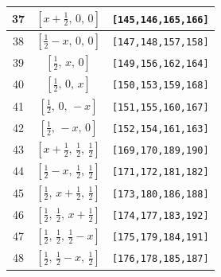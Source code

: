 \documentclass[fleqn,8pt]{jsarticle}
\begin{document}
\begin{longtable}{ccc}
37 & $\left[ x + \frac{1}{2},\, 0,\, 0 \right]$ & {\tt [145,146,165,166]} \\ \hline
38 & $\left[ \frac{1}{2} - x,\, 0,\, 0 \right]$ & {\tt [147,148,157,158]} \\ \hline
39 & $\left[ \frac{1}{2},\, x,\, 0 \right]$ & {\tt [149,156,162,164]} \\ \hline
40 & $\left[ \frac{1}{2},\, 0,\, x \right]$ & {\tt [150,153,159,168]} \\ \hline
41 & $\left[ \frac{1}{2},\, 0,\, - x \right]$ & {\tt [151,155,160,167]} \\ \hline
42 & $\left[ \frac{1}{2},\, - x,\, 0 \right]$ & {\tt [152,154,161,163]} \\ \hline
43 & $\left[ x + \frac{1}{2},\, \frac{1}{2},\, \frac{1}{2} \right]$ & {\tt [169,170,189,190]} \\ \hline
44 & $\left[ \frac{1}{2} - x,\, \frac{1}{2},\, \frac{1}{2} \right]$ & {\tt [171,172,181,182]} \\ \hline
45 & $\left[ \frac{1}{2},\, x + \frac{1}{2},\, \frac{1}{2} \right]$ & {\tt [173,180,186,188]} \\ \hline
46 & $\left[ \frac{1}{2},\, \frac{1}{2},\, x + \frac{1}{2} \right]$ & {\tt [174,177,183,192]} \\ \hline
47 & $\left[ \frac{1}{2},\, \frac{1}{2},\, \frac{1}{2} - x \right]$ & {\tt [175,179,184,191]} \\ \hline
48 & $\left[ \frac{1}{2},\, \frac{1}{2} - x,\, \frac{1}{2} \right]$ & {\tt [176,178,185,187]} \\
\end{longtable}
\renewcommand{\arraystretch}{1.2}
\end{document}

